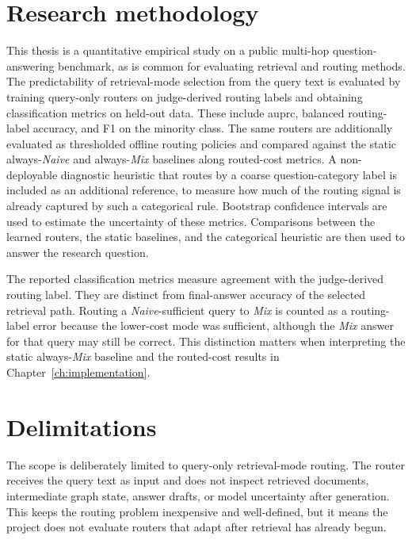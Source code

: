 \documentclass[english, bibtex]{kththesis}               %
\numberwithin{listing}{chapter}
\begin{document}
\section{Research methodology}
\label{sec:researchMethodology}

This thesis is a quantitative empirical study on a public multi-hop question-answering benchmark, as is common for evaluating retrieval and routing methods. The predictability of retrieval-mode selection from the query text is evaluated by training query-only routers on judge-derived routing labels and obtaining classification metrics on held-out data. These include \gls{auprc}, balanced routing-label accuracy, and F1 on the minority class. The same routers are additionally evaluated as thresholded offline routing policies and compared against the static always-\emph{Naive} and always-\emph{Mix} baselines along routed-cost metrics. A non-deployable diagnostic heuristic that routes by a coarse question-category label is included as an additional reference, to measure how much of the routing signal is already captured by such a categorical rule. Bootstrap confidence intervals are used to estimate the uncertainty of these metrics. Comparisons between the learned routers, the static baselines, and the categorical heuristic are then used to answer the research question.

The reported classification metrics measure agreement with the judge-derived routing label. They are distinct from final-answer accuracy of the selected retrieval path. Routing a \emph{Naive}-sufficient query to \emph{Mix} is counted as a routing-label error because the lower-cost mode was sufficient, although the \emph{Mix} answer for that query may still be correct. This distinction matters when interpreting the static always-\emph{Mix} baseline and the routed-cost results in Chapter~\ref{ch:implementation}.

\section{Delimitations}
\label{sec:delimitations}

The scope is deliberately limited to query-only retrieval-mode routing. The router receives the query text as input and does not inspect retrieved documents, intermediate graph state, answer drafts, or model uncertainty after generation. This keeps the routing problem inexpensive and well-defined, but it means the project does not evaluate routers that adapt after retrieval has already begun.
\end{document}
